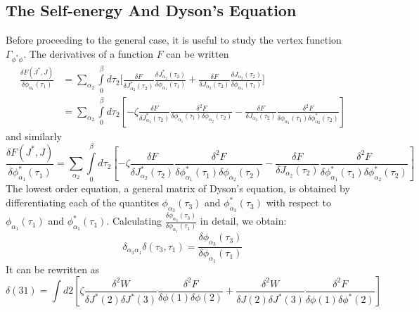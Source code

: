 \documentclass[12pt]{article}
\begin{document}
\subsection*{The Self-energy And Dyson's Equation}
Before proceeding to the general case, it is useful to study the vertex 
function $\Gamma_{\phi^*\phi}$. The derivatives of a function $F$ can be 
written
\begin{equation*}
    \begin{split}
        \frac{\delta F(J^*,J)}{\delta\phi_{\alpha_1}(\tau_1)}&=\sum_{\alpha_2}
        \int\limits_0^\beta d\tau_2\Bigg[\frac{\delta F}{\delta J^*_{\alpha_2}
        (\tau_2)}\frac{\delta J^*_{\alpha_2}(\tau_2)}{\delta\phi_{\alpha_1}
        (\tau_1)}+\frac{\delta F}{\delta J_{\alpha_2}(\tau_2)}\frac{\delta 
        J_{\alpha_2}(\tau_2)}{\delta\phi_{\alpha_1}(\tau_1)}\Bigg]\\
        &=\sum_{\alpha_2}\int\limits_0^\beta d\tau_2\left[-\zeta\frac{\delta F}
        {\delta J^*_{\alpha_2}(\tau_2)}\frac{\delta^2F}{\delta\phi_{\alpha_1}
        (\tau_1)\delta\phi_{\alpha_2}(\tau_2)}-\frac{\delta F}{\delta J
        _{\alpha_2}(\tau_2)}\frac{\delta^2F}{\delta\phi_{\alpha_1}(\tau_1)
        \delta\phi^*_{\alpha_2}(\tau_2)}\right]
    \end{split}
\end{equation*}
and similarly
\begin{equation*}
    \frac{\delta F(J^*,J)}{\delta\phi^*_{\alpha_1}(\tau_1)}
    =\sum_{\alpha_2}\int\limits_0^\beta d\tau_2\left[-\zeta\frac{\delta F}
    {\delta J^*_{\alpha_2}(\tau_2)}\frac{\delta^2F}{\delta\phi^*_{\alpha_1}
    (\tau_1)\delta\phi_{\alpha_2}(\tau_2)}-\frac{\delta F}{\delta J
    _{\alpha_2}(\tau_2)}\frac{\delta^2F}{\delta\phi^*_{\alpha_1}(\tau_1)
    \delta\phi^*_{\alpha_2}(\tau_2)}\right]
\end{equation*}
The lowest order equation, a general matrix of Dyson's equation, is obtained by 
differentiating each of the quantites $\phi_{\alpha_3}(\tau_3)$ and 
$\phi^*_{\alpha_3}(\tau_3)$ with respect to $\phi_{\alpha_1}(\tau_1)$ and 
$\phi^*_{\alpha_1}(\tau_1)$. Calculating $\frac{\delta\phi_{\alpha_3}(\tau_3)}
{\delta\phi_{\alpha_1}(\tau_1)}$ in detail, we obtain:
\begin{equation*}
    \delta_{\alpha_3\alpha_1}\delta(\tau_3,\tau_1)=
    \frac{\delta\phi_{\alpha_3}(\tau_3)}{\delta\phi_{\alpha_1}(\tau_1)}
\end{equation*}
It can be rewritten as
\begin{equation*}
    \delta(31)=\int d2\left[\zeta\frac{\delta^2W}{\delta J^*(2)\delta J^*(3)}
    \frac{\delta^2F}{\delta\phi(1)\delta\phi(2)}+\frac{\delta^2W}{\delta
    J(2)\delta J^*(3)}\frac{\delta^2F}{\delta\phi(1)\delta\phi^*(2)}\right]
\end{equation*}
\end{document}
